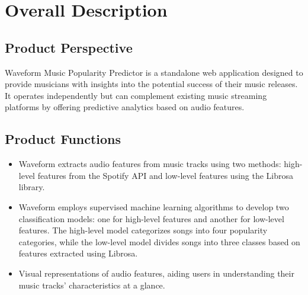\documentclass[11pt]{report}
\begin{document}
\newpage
\section{Overall Description}
\subsection{Product Perspective}
Waveform Music Popularity Predictor is a standalone web application designed to provide musicians with insights into the potential success of their music releases. It operates independently but can complement existing music streaming platforms by offering predictive analytics based on audio features.

\subsection{Product Functions}
\begin{itemize}
    \item Waveform extracts audio features from music tracks using two methods: high-level features from the Spotify API and low-level features using the Librosa library.
    \item Waveform employs supervised machine learning algorithms to develop two classification models: one for high-level features and another for low-level features. The high-level model categorizes songs into four popularity categories, while the low-level model divides songs into three classes based on features extracted using Librosa.
    \item Visual representations of audio features, aiding users in understanding their music tracks' characteristics at a glance.
\end{itemize}
\end{document}
